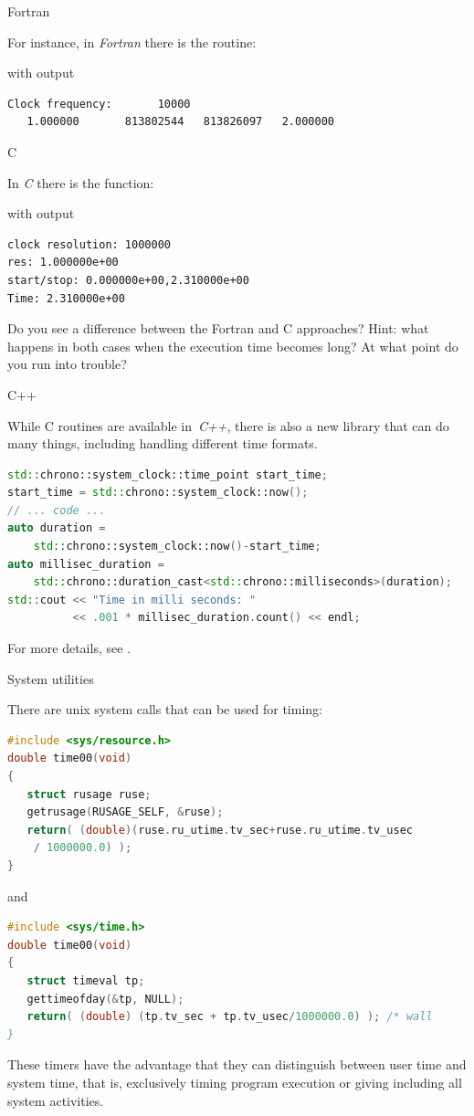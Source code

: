  {Fortran}

For instance, in \emph{Fortran} there is the 
routine:

with output
\begin{lstlisting}[language=shell]
 Clock frequency:       10000
   1.000000       813802544   813826097   2.000000  
\end{lstlisting}

 {C}

In \emph{C} there is the  function:

with output
\begin{lstlisting}[language=shell]
clock resolution: 1000000
res: 1.000000e+00
start/stop: 0.000000e+00,2.310000e+00
Time: 2.310000e+00
\end{lstlisting}
Do you see a difference between the Fortran and C approaches? Hint:
what happens in both cases when the execution time becomes long? At
what point do you run into trouble?

 {C++}

While C routines are available in~\emph{C++}, there is also a new
 library that can do many things, including
handling different time formats.
\begin{lstlisting}[language=c++]
std::chrono::system_clock::time_point start_time;
start_time = std::chrono::system_clock::now();
// ... code ...
auto duration =
    std::chrono::system_clock::now()-start_time;
auto millisec_duration =
    std::chrono::duration_cast<std::chrono::milliseconds>(duration);
std::cout << "Time in milli seconds: " 
          << .001 * millisec_duration.count() << endl;
\end{lstlisting}
For more details, see .

 {System utilities}

There are unix system calls that can be used for timing:
\begin{lstlisting}[language=cpp]
#include <sys/resource.h>                        
double time00(void)                              
{                                                
   struct rusage ruse;
   getrusage(RUSAGE_SELF, &ruse);
   return( (double)(ruse.ru_utime.tv_sec+ruse.ru_utime.tv_usec
    / 1000000.0) );
}
\end{lstlisting}
and 
\begin{lstlisting}[language=cpp]
#include <sys/time.h>
double time00(void)
{
   struct timeval tp;
   gettimeofday(&tp, NULL);
   return( (double) (tp.tv_sec + tp.tv_usec/1000000.0) ); /* wall
}
\end{lstlisting}
These timers have the advantage that they can
distinguish between user time and system time, that is, exclusively
timing program execution or giving 
including all system activities.

